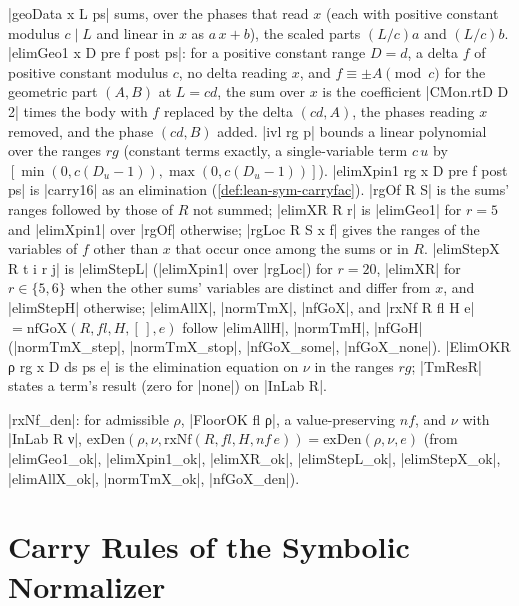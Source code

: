 \begin{definition}\label{def:lean-sym-geo}
\lean|geoData x L ps| sums, over the phases that read $x$ (each with positive constant modulus $c\mid L$ and linear in $x$ as $a\,x+b$), the scaled parts $(L/c)a$ and $(L/c)b$. \lean|elimGeo1 x D pre f post ps|: for a positive constant range $D=d$, a delta $f$ of positive constant modulus $c$, no delta reading $x$, and $f\equiv\pm A\pmod c$ for the geometric part $(A,B)$ at $L=cd$, the sum over $x$ is the coefficient \lean|CMon.rtD D 2| times the body with $f$ replaced by the delta $(cd,A)$, the phases reading $x$ removed, and the phase $(cd,B)$ added. \lean|ivl rg p| bounds a linear polynomial over the ranges $rg$ (constant terms exactly, a single-variable term $c\,u$ by $[\min(0,c(D_u-1)),\max(0,c(D_u-1))]$). \lean|elimXpin1 rg x D pre f post ps| is \lean|carry16| as an elimination (\cref{def:lean-sym-carryfac}). \lean|rgOf R S| is the sums' ranges followed by those of $R$ not summed; \lean|elimXR R r| is \lean|elimGeo1| for $r=5$ and \lean|elimXpin1| over \lean|rgOf| otherwise; \lean|rgLoc R S x f| gives the ranges of the variables of $f$ other than $x$ that occur once among the sums or in $R$. \lean|elimStepX R t i r j| is \lean|elimStepL| (\lean|elimXpin1| over \lean|rgLoc|) for $r=20$, \lean|elimXR| for $r\in\{5,6\}$ when the other sums' variables are distinct and differ from $x$, and \lean|elimStepH| otherwise; \lean|elimAllX|, \lean|normTmX|, \lean|nfGoX|, and \lean|rxNf R fl H e| $=\mathrm{nfGoX}(R,fl,H,[\,],e)$ follow \lean|elimAllH|, \lean|normTmH|, \lean|nfGoH| (\lean|normTmX_step|, \lean|normTmX_stop|, \lean|nfGoX_some|, \lean|nfGoX_none|). \lean|ElimOKR ρ rg x D ds ps e| is the elimination equation on $\nu$ in the ranges $rg$; \lean|TmResR| states a term's result (zero for \lean|none|) on \lean|InLab R|.
\end{definition}

\begin{theorem}\label{thm:lean-sym-rxNf}
\lean|rxNf_den|: for admissible $\rho$, \lean|FloorOK fl ρ|, a value-preserving $nf$, and $\nu$ with \lean|InLab R ν|, $\mathrm{exDen}(\rho,\nu,\mathrm{rxNf}(R,fl,H,nf\,e))=\mathrm{exDen}(\rho,\nu,e)$ (from \lean|elimGeo1_ok|, \lean|elimXpin1_ok|, \lean|elimXR_ok|, \lean|elimStepL_ok|, \lean|elimStepX_ok|, \lean|elimAllX_ok|, \lean|normTmX_ok|, \lean|nfGoX_den|).
\end{theorem}

\section{Carry Rules of the Symbolic Normalizer}\label{sec:lean-sym-carry}

